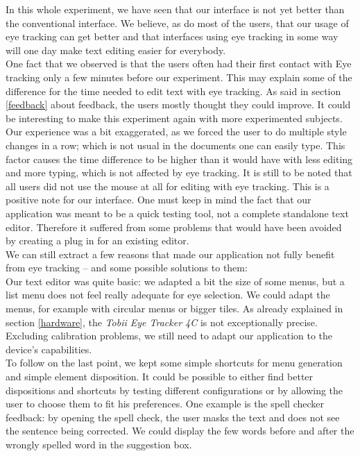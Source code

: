 \documentclass[12pt, a4paper]{article}
\begin{document}
In this whole experiment, we have seen that our interface is not yet better than the conventional interface. We believe, as do most of the users, that our usage of eye tracking can get better and that interfaces using eye tracking in some way will one day make text editing easier for everybody. \\
One fact that we observed is that the users often had their first contact with Eye tracking only a few minutes before our experiment. This may explain some of the difference for the time needed to edit text with eye tracking. As said in section \ref{feedback} about feedback, the users mostly thought they could improve. It could be interesting to make this experiment again with more experimented subjects. \\
Our experience was a bit exaggerated, as we forced the user to do multiple style changes in a row; which is not usual in the documents one can easily type. This factor causes the time difference to be higher than it would have with less editing and more typing, which is not affected by eye tracking. 
It is still to be noted that all users did not use the mouse at all for editing with eye tracking. This is a positive note for our interface. 
One must keep in mind the fact that our application was meant to be a quick testing tool, not a complete standalone text editor. Therefore it suffered from some problems that would have been avoided by creating a plug in for an existing editor. \\
We can still extract a few reasons that made our application not fully benefit from eye tracking -- and some possible solutions to them: \\
Our text editor was quite basic: we adapted a bit the size of some menus, but a list menu does not feel really adequate for eye selection. We could adapt the menus, for example with circular menus or bigger tiles. As already explained in section \ref{hardware}, the \textit{Tobii Eye Tracker 4C} is not exceptionally precise. Excluding calibration problems, we still need to adapt our application to the device's capabilities.\\
To follow on the last point, we kept some simple shortcuts for menu generation and simple element disposition. It could be possible to either find better dispositions and shortcuts by testing different configurations or by allowing the user to choose them to fit his preferences. One example is the spell checker feedback: by opening the spell check, the user masks the text and does not see the sentence being corrected. We could display the few words before and after the wrongly spelled word in the suggestion box. 
\end{document}
